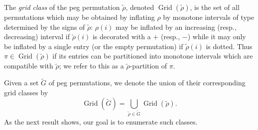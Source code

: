 \documentclass[10pt]{article}
\theoremstyle{plain}
\theoremstyle{definition}
\newcommand{\Grid}{\operatorname{Grid}}
\begin{document}
The \emph{grid class} of the peg permutation $\tilde{\rho}$, denoted $\Grid(\tilde{\rho})$, is the set of all permutations which may be obtained by inflating $\rho$ by monotone intervals of type determined by the signs of $\tilde{\rho}$: $\rho(i)$ may be inflated by an increasing (resp., decreasing) interval if $\tilde{\rho}(i)$ is decorated with a $+$ (resp., $-$) while it may only be inflated by a single entry (or the empty permutation) if $\tilde{\rho}(i)$ is dotted. Thus $\pi\in\Grid(\tilde{\rho})$ if its entries can be partitioned into monotone intervals which are compatible with $\tilde{\rho}$; we refer to this as a $\tilde{\rho}$-partition of $\pi$.

Given a set $\tilde{G}$ of peg permutations, we denote the union of their corresponding grid classes by
\[
\Grid(\tilde{G})=\bigcup_{\tilde{\rho}\in\tilde{G}} \Grid(\tilde{\rho}).
\]
As the next result shows, our goal is to enumerate such classes.
\end{document}
